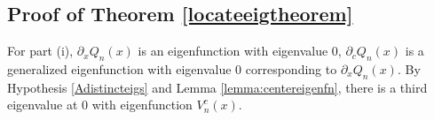 \documentclass[thesis.tex]{subfiles}
\begin{document}
\subsection{Proof of Theorem \ref{locateeigtheorem}}

For part (i), $\partial_x Q_n(x)$ is an eigenfunction with eigenvalue 0, $\partial_c Q_n(x)$ is a generalized eigenfunction with eigenvalue 0 corresponding to $\partial_x Q_n(x)$. By Hypothesis \ref{Adistincteigs} and Lemma \ref{lemma:centereigenfn}, there is a third eigenvalue at 0 with eigenfunction $V_n^c(x)$.

\iffulldocument\else
	
	
\fi
\end{document}
